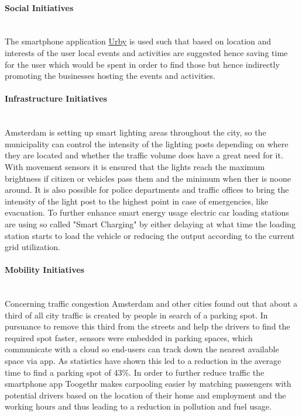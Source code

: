 \documentclass[a4paper,12pt]{report}
\begin{document}
		\paragraph{Social Initiatives} \hfill \\
		The smartphone application \href{http://www.urbyapp.com/}{Urby} is used such that based on location and interests of the user local events and activities are suggested hence saving time for the user which would be spent in order to find those but hence indirectly promoting the businesses hosting the events and activities.
		\paragraph{Infrastructure Initiatives \cite{SmartCityAmsterdamYT}} \hfill \\
		Amsterdam is setting up smart lighting areas throughout the city, so the municipality can control the intensity of the lighting posts depending on where they are located and whether the traffic volume does have a great need for it. With movement sensors it is ensured that the lights reach the maximum brightness if citizen or vehicles pass them and the minimum when ther is noone around. It is also possible for police departments and traffic offices to bring the intensity of the light post to the highest point in case of emergencies, like evacuation. To further enhance smart energy usage electric car loading stations are using so called "Smart Charging" by either delaying at what time the loading station starts to load the vehicle or reducing the output according to the current grid utilization.
		\paragraph{Mobility Initiatives} \hfill \label{AmsterdamMobilityInitiatives} \\
		Concerning traffic congestion Amsterdam and other cities found out that about a third of all city traffic is created by people in search of a parking spot. In pursuance to remove this third from the streets and help the drivers to find the required spot faster, sensors were embedded in parking spaces, which communicate with a cloud so end-users can track down the nearest available space via app. As statistics have shown this led to a reduction in the average time to find a parking spot of 43\%. In order to further reduce traffic the smartphone app Toogethr makes carpooling easier by matching passengers with potential drivers based on the location of their home and employment and the working hours and thus leading to a reduction in pollution and fuel usage.
\end{document}
